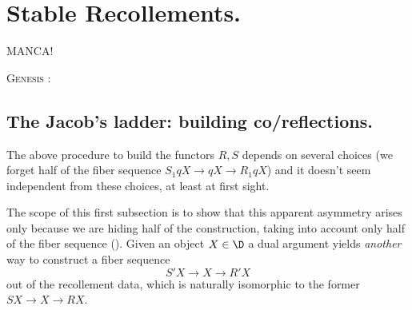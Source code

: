 \section{Stable Recollements.}\label{stabrecoll}

\renewcommand{\textflush}{flushright}
\epigraph{MANCA!
}{\textsc{Genesis} :}
\renewcommand{\textflush}{flushleft}
\subsection{The Jacob's ladder: building co/reflections.}
The above procedure to build the functors $R,S$ depends on several choices (we forget half of the fiber sequence $S_1 q X\to qX\to R_1 qX$) and it doesn't seem independent from these choices, at least at first sight. 

The scope of this first subsection is to show that this apparent asymmetry arises only because we are hiding half of the construction, taking into account only half of the fiber sequence (). Given an object $X\in \D$ a dual argument yields \emph{another} way to construct a fiber sequence
\[
	S' X\to X\to R' X
\]
out of the recollement data, which is naturally isomorphic to the former $SX\to X\to RX$. 

